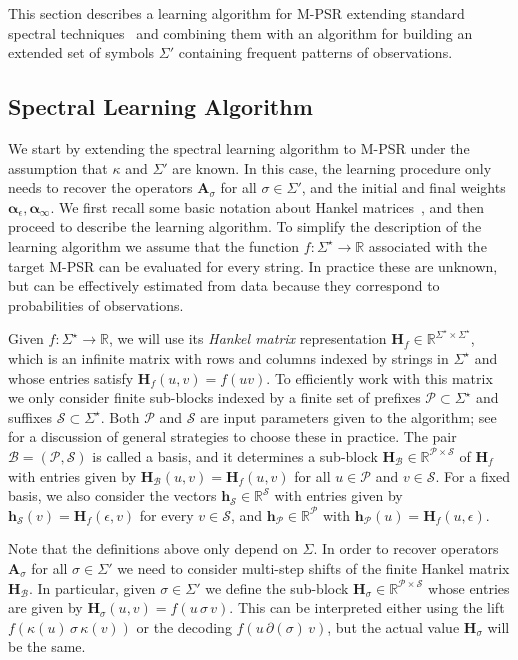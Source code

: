 \documentclass[letterpaper]{article}
\newcommand{\mat}[1]{\mathbf{#1}}
\newcommand{\A}{\mat{A}}
\renewcommand{\H}{\mat{H}}
\newcommand{\Rset}{\mathbb{R}}
\newcommand{\R}{\Rset}
\newcommand{\sstar}{\Sigma^\star}
\newcommand{\aone}{\boldsymbol{\alpha}_\epsilon}
\newcommand{\ainf}{\boldsymbol{\alpha}_{\infty}}
\newcommand{\Bs}{\mathcal{B}}
\newcommand{\Ps}{\mathcal{P}}
\newcommand{\Ss}{\mathcal{S}}
\begin{document}
This section describes a learning algorithm for M-PSR extending standard spectral techniques~\cite{bootspsr} and combining them with an algorithm for building an extended set of symbols $\Sigma'$ containing frequent patterns of observations.

\subsection{Spectral Learning Algorithm}

We start by extending the spectral learning algorithm to M-PSR under the assumption that $\kappa$ and $\Sigma'$ are known. In this case, the learning procedure only needs to recover the operators $\A_\sigma$ for all $\sigma \in \Sigma'$, and the initial and final weights $\aone, \ainf$. We first recall some basic notation about Hankel matrices~\cite{CarlylePaz71,Fliess74}, and then proceed to describe the learning algorithm. To simplify the description of the learning algorithm we assume that the function $f : \sstar \to \R$ associated with the target M-PSR can be evaluated for every string. In practice these are unknown, but can be effectively estimated from data because they correspond to probabilities of observations. 

Given $f : \sstar \to \R$, we will use its \emph{Hankel matrix} representation $\H_f \in \R^{\sstar \times \sstar}$, which is an infinite matrix with rows and columns indexed by strings in $\sstar$ and whose entries satisfy $\H_f(u,v) = f(u v)$. To efficiently work with this matrix we only consider finite sub-blocks indexed by a finite set of prefixes $\Ps \subset \sstar$ and suffixes $\Ss \subset \sstar$. Both $\Ps$ and $\Ss$ are input parameters given to the algorithm; see \cite{icml12} for a discussion of general strategies to choose these in practice. The pair $\Bs = (\Ps,\Ss)$ is called a basis, and it determines a sub-block $\H_\Bs \in \R^{\Ps \times \Ss}$ of $\H_f$ with entries given by $\H_\Bs(u,v) = \H_f(u,v)$ for all $u \in \Ps$ and $v \in \Ss$. For a fixed basis, we also consider the vectors $\mat{h}_{\Ss} \in \R^{\Ss}$ with entries given by $\mat{h}_{\Ss}(v) = \H_f(\epsilon,v)$ for every $v \in \Ss$, and $\mat{h}_{\Ps} \in \R^{\Ps}$ with $\mat{h}_{\Ps}(u) = \H_f(u,\epsilon)$.

Note that the definitions above only depend on $\Sigma$. In order to recover operators $\A_\sigma$ for all $\sigma \in \Sigma'$ we need to consider multi-step shifts of the finite Hankel matrix $\H_{\Bs}$. In particular, given $\sigma \in \Sigma'$ we define the sub-block $\H_\sigma \in \R^{\Ps \times \Ss}$ whose entries are given by $\H_\sigma(u,v) = f(u \, \sigma \, v)$. This can be interpreted either using the lift $f(\kappa(u) \, \sigma \, \kappa(v))$ or the decoding $f(u \, \partial(\sigma) \, v)$, but the actual value $\H_\sigma$ will be the same.
\end{document}
